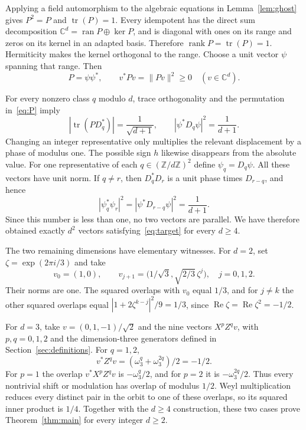 \documentclass[11pt]{article}
\newcommand{\C}{\mathbb C}
\newcommand{\Z}{\mathbb Z}
\newcommand{\tr}{\operatorname{tr}}
\begin{document}
Applying a field automorphism to the algebraic equations in
Lemma~\ref{lem:ghost} gives $P^2=P$ and $\tr(P)=1$.
Every idempotent has the direct sum decomposition
$\C^d=\operatorname{ran}P\oplus\ker P$, and is diagonal with ones on its
range and zeros on its kernel in an adapted basis. Therefore
$\operatorname{rank}P=\tr(P)=1$. Hermiticity makes the kernel orthogonal to
the range. Choose a unit vector $\psi$ spanning that range. Then
\begin{equation}
\label{eq:projector}
 P=\psi\psi^*,\qquad v^*Pv=\|Pv\|^2\geq0\quad(v\in\C^d).
\end{equation}

For every nonzero class $q$ modulo $d$, trace orthogonality and the
permutation in~\eqref{eq:P} imply
\begin{equation}
\label{eq:overlap}
 |\tr(PD_q^*)|=\frac1{\sqrt{d+1}},\qquad
 |\psi^*D_q\psi|^2=\frac1{d+1}.
\end{equation}
Changing an integer representative only multiplies the relevant
displacement by a phase of modulus one. The possible sign $h$ likewise
disappears from the absolute value.
For one representative of each $q\in(\Z/d\Z)^2$ define $\psi_q=D_q\psi$.
All these vectors have unit norm. If $q\ne r$, then $D_q^*D_r$ is a unit
phase times $D_{r-q}$, and hence
\[
 |\psi_q^*\psi_r|^2=|\psi^*D_{r-q}\psi|^2=\frac1{d+1}.
\]
Since this number is less than one, no two vectors are parallel. We have
therefore obtained exactly $d^2$ vectors satisfying~\eqref{eq:target}
for every $d\geq4$.

The two remaining dimensions have elementary witnesses. For $d=2$, set
$\zeta=\exp(2\pi i/3)$ and take
\[
 v_0=(1,0),\qquad
 v_{j+1}=\bigl(1/\sqrt3,\sqrt{2/3}\,\zeta^j\bigr),\quad j=0,1,2.
\]
Their norms are one. The squared overlaps with $v_0$ equal $1/3$, and for
$j\ne k$ the other squared overlaps equal
$|1+2\zeta^{k-j}|^2/9=1/3$, since
$\operatorname{Re}\zeta=\operatorname{Re}\zeta^2=-1/2$.

For $d=3$, take $v=(0,1,-1)/\sqrt2$ and the nine vectors
$X^pZ^qv$, with $p,q=0,1,2$ and the dimension-three generators defined
in Section~\ref{sec:definitions}. For $q=1,2$,
\[
 v^*Z^qv=(\omega_3^q+\omega_3^{2q})/2=-1/2.
\]
For $p=1$ the overlap $v^*X^pZ^qv$ is $-\omega_3^q/2$, and for $p=2$
it is $-\omega_3^{2q}/2$. Thus every nontrivial shift or modulation has
overlap of modulus $1/2$. Weyl multiplication reduces every distinct pair
in the orbit to one of these overlaps, so its squared inner product is
$1/4$. Together with the $d\geq4$ construction, these two cases prove
Theorem~\ref{thm:main} for every integer $d\geq2$.
\end{document}
